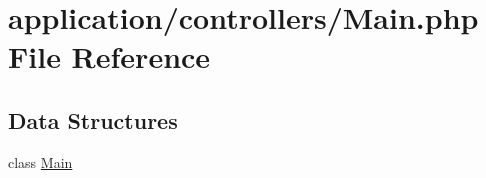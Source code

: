 \hypertarget{_main_8php}{}\section{application/controllers/\+Main.php File Reference}
\label{_main_8php}
\subsection*{Data Structures}
\begin{DoxyCompactItemize}
\item 
class \mbox{\hyperlink{class_main}{Main}}
\end{DoxyCompactItemize}
